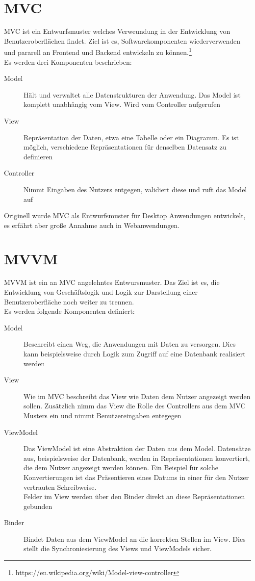 \section{\acs{MVC}}
\ac{MVC} ist ein Entwurfsmuster welches Verweundung in der Entwicklung von
Benutzeroberflächen findet. Ziel ist es, Softwarekomponenten wiederverwenden und
pararell an Frontend und Backend entwickeln zu können.\footnote{https://en.wikipedia.org/wiki/Model-view-controller}\\
Es werden drei Komponenten beschrieben:
\begin{description}
\item[Model]{Hält und verwaltet alle Datenstrukturen der Anwendung. Das Model ist komplett
  unabhängig vom View. Wird vom Controller aufgerufen}
\item[View]{Repräsentation der Daten, etwa eine Tabelle oder ein Diagramm. Es
    ist möglich, verschiedene Repräsentationen für denselben Datensatz zu definieren}
\item[Controller]{Nimmt Eingaben des Nutzers entgegen, validiert diese und ruft
    das Model auf}
\end{description}
Originell wurde \ac{MVC} als Entwurfsmuster für Desktop Anwendungen entwickelt,
es erfährt aber große Annahme auch in Webanwendungen.
\section{\acs{MVVM}}
\ac{MVVM} ist ein an \ac{MVC} angelehntes Entwursmuster. Das Ziel ist es, die
Entwicklung von Geschäftslogik und Logik zur Darstellung einer
Benutzeroberfläche noch weiter zu trennen.\\
Es werden folgende Komponenten definiert:
\begin{description}
\item[Model]{Beschreibt einen Weg, die Anwendungen mit Daten zu versorgen. Dies
    kann beispielsweise durch Logik zum Zugriff auf eine Datenbank realisiert werden}
\item[View]{Wie im \ac{MVC} beschreibt das View wie Daten dem Nutzer angezeigt
    werden sollen. Zusätzlich nimm das View die Rolle des Controllers aus dem
    \ac{MVC} Musters ein und nimmt Benutzereingaben entegegen}
\item[ViewModel]{Das ViewModel ist eine Abstraktion der Daten aus dem Model.
    Datensätze aus, beispielsweise der Datenbank, werden in Repräsentationen
    konvertiert, die dem Nutzer angezeigt werden können. Ein Beispiel für solche
    Konvertierungen ist das Präsentieren eines Datums in einer für den Nutzer
    vertrauten Schreibweise.\\
    Felder im View werden über den Binder direkt an diese Repräsentationen gebunden}
\item[Binder]{Bindet Daten aus dem ViewModel an die korrekten Stellen im View.
    Dies stellt die Synchroniesierung des Views und ViewModels sicher.}
\end{description}

